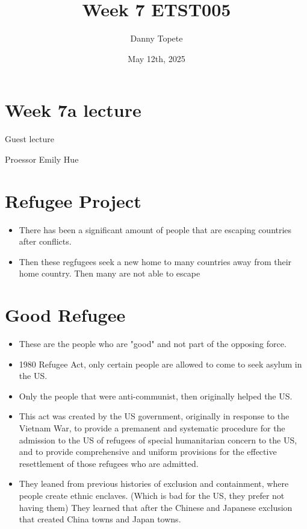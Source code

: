 \documentclass{article}
\title{Week 7 ETST005}
\author{Danny Topete}
\date{May 12th, 2025}
\begin{document}
\maketitle

\section*{Week 7a lecture}
Guest lecture

Proessor Emily Hue


\section{Refugee Project}
\begin{itemize}
  \item There has been a significant amount of people that are
    escaping countries after conflicts.
  \item Then these regfugees seek a new home to many countries away
    from their home country. Then many are not able to escape
\end{itemize}

\section{Good Refugee}

\begin{itemize}
  \item These are the people who are "good" and not
    part of the opposing force.
  \item 1980 Refugee Act, only certain people are allowed
    to come to seek asylum in the US.
  \item Only the people that were anti-communist, then originally helped
    the US.
  \item This act was created by the US government, originally in response to the
    Vietnam War, to provide a premanent and systematic procedure for the admission
    to the US of refugees of special humanitarian concern to the US,
    and to provide comprehensive and uniform provisions for the
    effective resettlement of those refugees who are admitted.
  \item They leaned from previous histories of exclusion and containment, where
    people create ethnic enclaves. (Which is bad for the US, they prefer not having them)
    They learned that after the Chinese and Japanese exclusion that created
    China towns and Japan towns.
\end{itemize}
\end{document}
